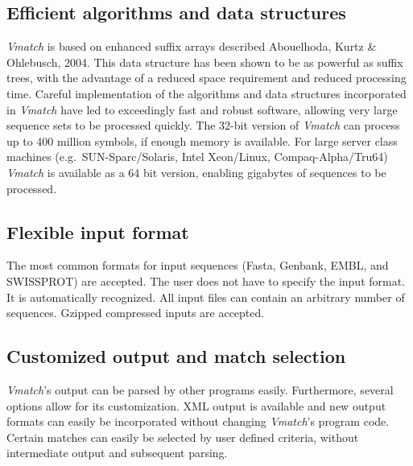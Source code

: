\documentclass[12pt,titlepage]{article}
\begin{document}
\begin{AboutVmatch}
\subsection*{Efficient algorithms and data structures}
\emph{Vmatch} is based on enhanced suffix arrays
described  Abouelhoda, Kurtz \& Ohlebusch, 2004.
This data structure
has been shown to be as powerful as suffix trees, with the advantage of
a reduced space requirement and reduced processing time. Careful 
implementation of the algorithms and data structures incorporated in
\emph{Vmatch} have led to exceedingly fast and robust software,
allowing very large sequence sets to be processed quickly.
The 32-bit version of \emph{Vmatch} can process 
up to 400 million symbols, if enough memory is available.
For large server class machines (e.g.\ SUN-Sparc/Solaris,
Intel Xeon/Linux, Compaq-Alpha/Tru64) \emph{Vmatch} 
is available as a 64 bit version, enabling gigabytes of sequences
to be processed.

\subsection*{Flexible input format}
The most common formats for input sequences (Fasta, Genbank, EMBL, and
SWISSPROT) are accepted. The user does not have to specify the input
format. It is automatically recognized. All input files can contain
an arbitrary number of sequences. Gzipped compressed inputs are
accepted.

\subsection*{Customized output and match selection}
\emph{Vmatch}'s output can be parsed by other programs easily.
Furthermore, several options allow for its customization.
XML output is available and new output formats can easily be 
incorporated without changing \emph{Vmatch}'s
program code. Certain matches can easily be selected by
user defined criteria, without intermediate output and subsequent
parsing.


\end{AboutVmatch}
\end{document}
